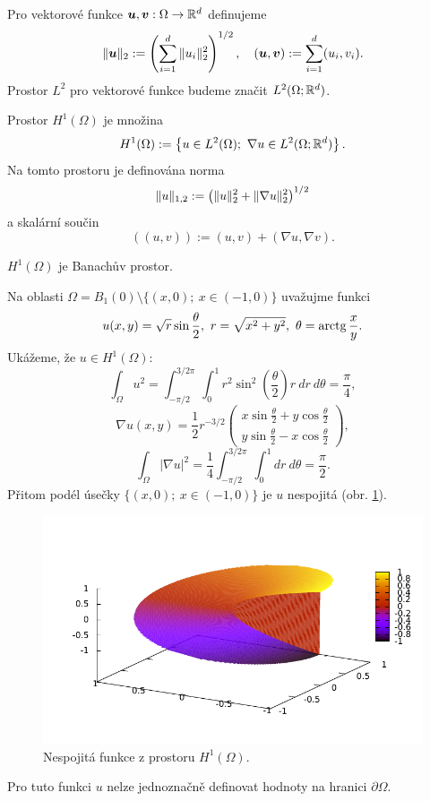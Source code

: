 Pro vektorové funkce $\mathbf{\boldsymbol{u}},\mathbf{\boldsymbol{v}}:\Omega\rightarrow\mathbb R^d$ definujeme
\[ \|\mathbf{\boldsymbol{u}}\|_2 := \left(\sum_{i=1}^d\|u_i\|_2^2\right)^{1/2},\quad (\mathbf{\boldsymbol{u}},\mathbf{\boldsymbol{v}}):=\sum_{i=1}^d(u_i,v_i). \]
Prostor $L^2$ pro vektorové funkce budeme značit $L^2(\Omega;\mathbb R^d)$.
\begin{df}
Prostor $H^1(\Omega)$ je množina
\[ H^1(\Omega):=\left\{u\in L^2(\Omega);~\nabla u\in L^2(\Omega;\mathbb R^d)\right\}. \]
Na tomto prostoru je definována norma
\[ \|u\|_{1,2} := \left(\|u\|_2^2 + \|\nabla u\|_2^2\right)^{1/2} \]
a skalární součin
\[ ((u,v)):=(u,v) + (\nabla u,\nabla v). \]
\end{df}
\begin{veta}
$H^1(\Omega)$ je Banachův prostor.
\end{veta}

\begin{ex}
Na oblasti $\Omega=B_1(0)\setminus\{(x,0);~x\in(-1,0)\}$ uvažujme funkci
\[ u(x,y)=\sqrt{r}\sin\frac\theta2,~r=\sqrt{x^2+y^2},~\theta=\operatorname{arctg}\frac xy. \]
Ukážeme, že $u\in H^1(\Omega)$:
\[ \int_\Omega u^2 = \int_{-\pi/2}^{3/2\pi}\int_0^1r^2\sin^2\left(\frac\theta2\right) r~dr~d\theta=\frac\pi4, \]
\[ \nabla u(x,y)=\frac12r^{-3/2}\begin{pmatrix}x\sin\frac\theta2+y\cos\frac\theta2\\y\sin\frac\theta2-x\cos\frac\theta2\end{pmatrix}, \]
\[ \int_\Omega |\nabla u|^2 = \frac14\int_{-\pi/2}^{3/2\pi}\int_0^1 dr~d\theta = \frac\pi2. \]
Přitom podél úsečky $\{(x,0);~x\in(-1,0) \}$ je $u$ nespojitá (obr. \ref{fig:disc_h1}).
\begin{figure}
\includegraphics[width=12cm]{discontinuous_h1}
\caption{Nespojitá funkce z prostoru $H^1(\Omega)$.}
\label{fig:disc_h1}
\end{figure}
Pro tuto funkci $u$ nelze jednoznačně definovat hodnoty na hranici $\partial\Omega$.
\end{ex}

